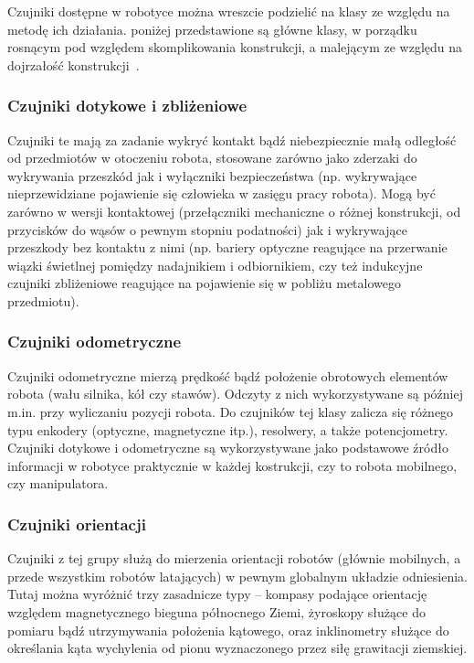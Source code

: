 Czujniki dostępne w robotyce można wreszcie podzielić na klasy ze względu 
na metodę ich działania. poniżej przedstawione są główne klasy, w porządku
rosnącym pod względem skomplikowania konstrukcji, a malejącym ze względu na
dojrzałość konstrukcji~\cite{siegwart}.

\subsubsection{Czujniki dotykowe i zbliżeniowe}

Czujniki te mają za zadanie wykryć kontakt bądź niebezpiecznie małą odległość
od przedmiotów w otoczeniu robota, stosowane zarówno jako zderzaki do wykrywania
przeszkód jak i wyłączniki bezpieczeństwa (np. wykrywające nieprzewidziane 
pojawienie się człowieka w zasięgu pracy robota). Mogą być zarówno w wersji 
kontaktowej (przełączniki mechaniczne o różnej konstrukcji, od przycisków
do wąsów o pewnym stopniu podatności) jak i wykrywające przeszkody bez 
kontaktu z nimi (np. bariery optyczne reagujące na przerwanie wiązki świetlnej
pomiędzy nadajnikiem i odbiornikiem, czy też indukcyjne czujniki zbliżeniowe
reagujące na pojawienie się w pobliżu metalowego przedmiotu).

\subsubsection{Czujniki odometryczne}

Czujniki odometryczne mierzą prędkość bądź położenie obrotowych elementów
robota (wału silnika, kół czy stawów). Odczyty z nich wykorzystywane są 
później m.in. przy wyliczaniu pozycji robota. Do czujników tej klasy zalicza się
różnego typu enkodery (optyczne, magnetyczne itp.), resolwery, a także potencjometry.
Czujniki dotykowe i odometryczne są wykorzystywane jako podstawowe źródło 
informacji w robotyce praktycznie w każdej kostrukcji, czy to robota mobilnego,
czy manipulatora.

\subsubsection{Czujniki orientacji}

Czujniki z tej grupy służą do mierzenia orientacji robotów (głównie mobilnych, 
a przede wszystkim robotów latających) w pewnym globalnym układzie odniesienia.
Tutaj można wyróżnić trzy zasadnicze typy -- kompasy podające orientację
względem magnetycznego bieguna północnego Ziemi, żyroskopy służące do pomiaru
bądź utrzymywania położenia kątowego, oraz inklinometry służące do określania 
kąta wychylenia od pionu wyznaczonego przez siłę grawitacji ziemskiej.

